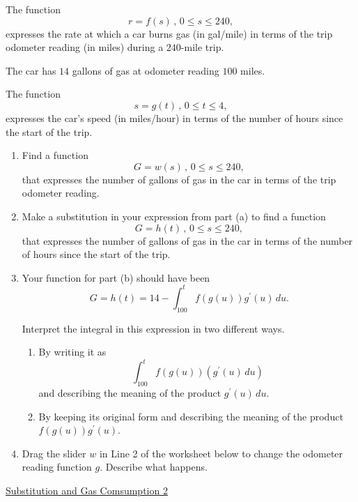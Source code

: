\documentclass{ximera}
\begin{document}
\begin{example} \label{Ex:KDfdfer3rER}

The function
\[
    r = f(s) \, , \, 0 \leq s \leq 240,
\]
expresses the rate at which a car burns gas (in gal/mile) in terms of the trip odometer reading (in miles) during a $240$-mile trip.

The car has $14$ gallons of gas at odometer reading $100$ miles.

The function 
\[
      s = g(t) \, , \, 0\leq t \leq 4 ,
\]
expresses the car's speed (in miles/hour) in terms of the number of hours since the start of the trip.

\begin{enumerate}
\item Find a function 
\[
      G = w(s) \, , \, 0 \leq s \leq 240,
\]
that expresses the number of gallons of gas in the car in terms of the trip odometer reading.

\item Make a substitution in your expression from part (a) to find a function 
\[
  G = h(t) \, , \, 0 \leq s \leq 240,
\]
that expresses the number of gallons of gas in the car in terms of the number of hours since the start of the trip.

\item Your function for part (b) should have been
\[
     G = h(t) = 14 - \int_{100}^t f(g(u))g^\prime(u)  \, du .
\]

Interpret the integral in this expression in two different ways.

\begin{enumerate}
\item By writing it as
\[
   \int_{100}^t f(g(u))(  g^\prime(u)  \, du )
\]
and describing the meaning of the product $g^\prime(u)\, du$.

\item By keeping its original form and describing the meaning of the product $f(g(u))g^\prime(u)$.

\end{enumerate}

\item Drag the slider $w$ in Line 2 of the worksheet below to change the odometer reading function $g$. Describe what happens.

\end{enumerate}

\begin{onlineOnly}
    \begin{center}
\end{center}
\end{onlineOnly}

\href{https://www.desmos.com/calculator/gsdzd0lbva}{Substitution and Gas Comsumption 2}

\end{example}
\end{document}
